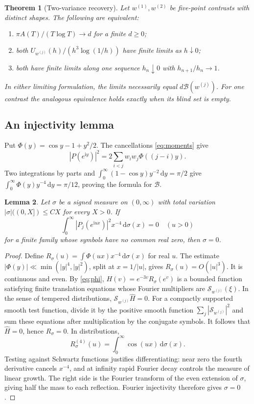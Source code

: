 \documentclass[11pt]{article}
\newtheorem{theorem}{Theorem}[section]
\newtheorem{lemma}[theorem]{Lemma}
\theoremstyle{definition}\newtheorem{definition}[theorem]{Definition}
\theoremstyle{remark}\newtheorem{remark}[theorem]{Remark}
\newcommand{\dd}{\,\mathrm d}\newcommand{\ii}{\mathrm i}
\newcommand{\Sym}{\mathcal S}
\newcommand{\B}{\mathcal B}
\newcommand{\tauh}{h^3\log(1/h)}
\begin{document}
\begin{theorem}[Two-variance recovery]\label{thm:recovery}
Let $w^{(1)},w^{(2)}$ be five-point contrasts with distinct shapes.
The following are equivalent:
\begin{enumerate}[label=\textup{(\alph*)}]
\item $\pi A(T)/(T\log T)\to d$ for a finite $d\ge0$;
\item both $U_{w^{(j)}}(h)/(\tauh)$ have finite limits as $h\downarrow0$;
\item both have finite limits along one sequence $h_n\downarrow0$ with $h_{n+1}/h_n\to1$.
\end{enumerate}
In either limiting formulation, the limits necessarily equal $d\B(w^{(j)})$.
For one contrast the analogous equivalence holds exactly when its blind set is empty.
\end{theorem}

\subsection{An injectivity lemma}

Put $\Phi(y)=\cos y-1+y^2/2$. The cancellations \eqref{eq:moments} give
\begin{equation}\label{eq:phi}
 |P(e^{\ii y})|^2=2\sum_{i<j}w_iw_j\Phi((j-i)y).
\end{equation}
Two integrations by parts and $\int_0^\infty(1-\cos y)y^{-2}\dd y=\pi/2$
give $\int_0^\infty\Phi(y)y^{-4}\dd y=\pi/12$, proving the formula for $\B$.

\begin{lemma}\label{lem:injective}
Let $\sigma$ be a signed measure on $(0,\infty)$ with total variation
$|\sigma|((0,X])\le C X$ for every $X>0$.
If
\[
 \int_0^\infty |P_j(e^{\ii ux})|^2x^{-4}\dd\sigma(x)=0
 \quad(u>0)
\]
for a finite family whose symbols have no common real zero, then $\sigma=0$.
\end{lemma}
\begin{proof}
Define $R_\sigma(u)=\int\Phi(ux)x^{-4}\dd\sigma(x)$ for real $u$.
The estimate $|\Phi(y)|\ll\min(|y|^4,|y|^2)$, split at $x=1/|u|$,
gives $R_\sigma(u)=O(|u|^3)$. It is continuous and even.
By \eqref{eq:phi}, $H(v)=e^{-3v}R_\sigma(e^v)$ is a bounded function
satisfying finite translation equations whose Fourier multipliers are
$\Sym_{w^{(j)}}(\xi)$. In the sense of tempered distributions,
$\Sym_{w^{(j)}}\widehat H=0$. For a compactly supported smooth test function,
divide it by the positive smooth function $\sum_j|\Sym_{w^{(j)}}|^2$ and
sum these equations after multiplication by the conjugate symbols.
It follows that $\widehat H=0$, hence $R_\sigma=0$.
In distributions,
\[
 R_\sigma^{(4)}(u)=\int_0^\infty\cos(ux)\dd\sigma(x).
\]
Testing against Schwartz functions justifies differentiating: near zero the
fourth derivative cancels $x^{-4}$, and at infinity rapid Fourier decay
controls the measure of linear growth. The right side is the Fourier transform
of the even extension of $\sigma$, giving half the mass to each reflection.
Fourier injectivity therefore gives $\sigma=0$.
\end{proof}
\end{document}
